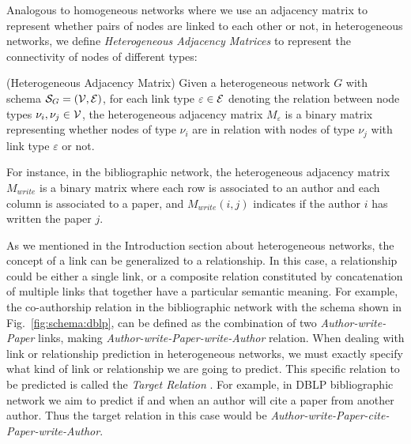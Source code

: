 {\color{red}
Analogous to homogeneous networks where we use an adjacency matrix to represent whether pairs of nodes are linked to each other or not, in heterogeneous networks, we define \emph{Heterogeneous Adjacency Matrices} to represent the connectivity of nodes of different types:

\begin{definition}{(Heterogeneous Adjacency Matrix)}
Given a heterogeneous network $G$ with schema $\mathcal{S}_G=(\mathcal{V}, \mathcal{E})$, for each link type $\varepsilon\in\mathcal{E}$ denoting the relation between node types $\nu_i,\nu_j\in\mathcal{V}$, the heterogeneous adjacency matrix $M_{\varepsilon}$ is a binary matrix representing whether nodes of type $\nu_i$ are in relation with nodes of type $\nu_j$ with link type $\varepsilon$ or not.
\end{definition}

For instance, in the bibliographic network, the heterogeneous adjacency matrix $M_{write}$ is a binary matrix where each row is associated to an author and each column is associated to a paper, and $M_{write}{(i,j)}$ indicates if the author $i$ has written the paper $j$.
}

As we mentioned in the Introduction section about heterogeneous networks, the concept of a link can be generalized to a relationship. In this case, a relationship could be either a single link, or a composite relation constituted by concatenation of multiple links that together have a particular semantic meaning. For example, the co-authorship relation in the bibliographic network with the schema shown in Fig.~\ref{fig:schema:dblp}, can be defined as the combination of two \emph{Author-{write}-Paper} links, making \emph{Author-{write}-Paper-{write}-Author} relation. When dealing with link or relationship prediction in heterogeneous networks, we must exactly specify what kind of link or relationship we are going to predict. This specific relation to be predicted is called the \emph{Target Relation} \cite{sun2012will}. For example, in DBLP bibliographic network we aim to predict if and when an author will cite a paper from another author. Thus the target relation in this case would be \emph{Author-{write}-Paper-{cite}-Paper-{write}-Author}.

